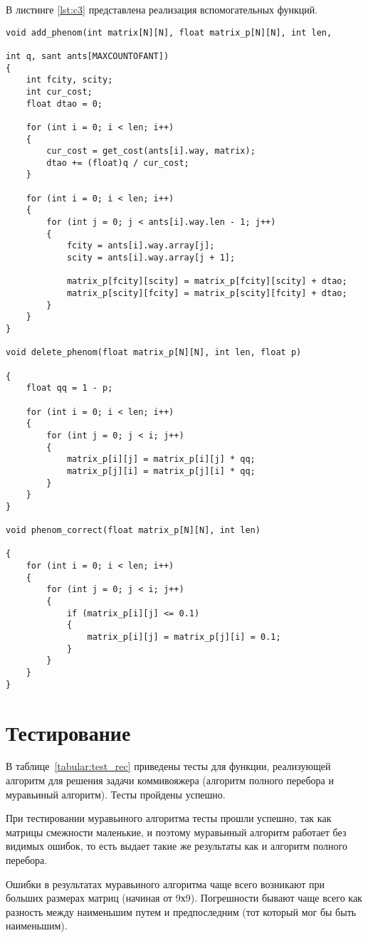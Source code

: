 В листинге \ref{lst:c3} представлена реализация вспомогательных функций.

\begin{lstlisting}[label=lst:c3,caption=Вспомогательные функции]
void add_phenom(int matrix[N][N], float matrix_p[N][N], int len,

int q, sant ants[MAXCOUNTOFANT])
{
	int fcity, scity;
	int cur_cost;
	float dtao = 0;

	for (int i = 0; i < len; i++)
	{
		cur_cost = get_cost(ants[i].way, matrix);
		dtao += (float)q / cur_cost;
	}
	
	for (int i = 0; i < len; i++)
	{
		for (int j = 0; j < ants[i].way.len - 1; j++)
		{
			fcity = ants[i].way.array[j];
			scity = ants[i].way.array[j + 1];
			
			matrix_p[fcity][scity] = matrix_p[fcity][scity] + dtao;
			matrix_p[scity][fcity] = matrix_p[scity][fcity] + dtao;
		}
	}
}

void delete_phenom(float matrix_p[N][N], int len, float p)

{
	float qq = 1 - p;

	for (int i = 0; i < len; i++)
	{
		for (int j = 0; j < i; j++)
		{
			matrix_p[i][j] = matrix_p[i][j] * qq;
			matrix_p[j][i] = matrix_p[j][i] * qq;
		}
	}
}

void phenom_correct(float matrix_p[N][N], int len)

{
	for (int i = 0; i < len; i++)
	{
		for (int j = 0; j < i; j++)
		{
			if (matrix_p[i][j] <= 0.1)
			{
		    	matrix_p[i][j] = matrix_p[j][i] = 0.1;
			}
		}
	}
}
\end{lstlisting}

\captionsetup{singlelinecheck = false, justification=centering}

\section{Тестирование}
В таблице~\ref{tabular:test_rec} приведены тесты для функции, реализующей алгоритм для решения задачи коммивояжера (алгоритм полного перебора и муравьиный алгоритм). Тесты пройдены успешно.

При тестировании муравьиного алгоритма тесты прошли успешно, так как матрицы смежности маленькие, и поэтому муравьиный алгоритм работает без видимых ошибок, то есть выдает такие же результаты как и алгоритм полного перебора.

Ошибки в результатах муравьиного алгоритма чаще всего возникают при больших размерах матриц (начиная от 9х9). Погрешности бывают чаще всего как разность между наименьшим путем и предпоследним (тот который мог бы быть наименьшим).

